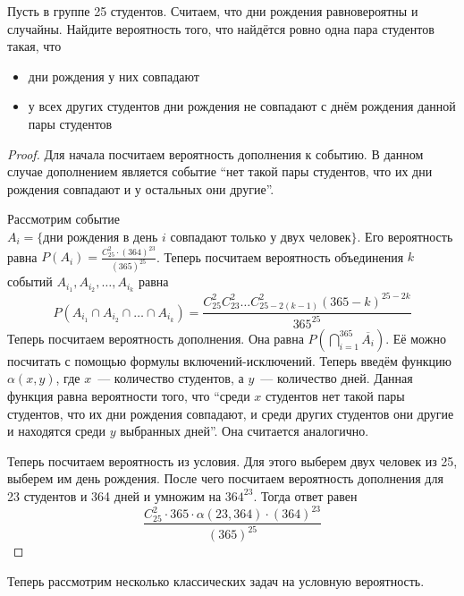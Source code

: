 \documentclass[a4paper,12pt]{article}
\begin{document}
\begin{problem}
	Пусть в группе 25 студентов. Считаем, что дни рождения равновероятны и случайны. Найдите вероятность того, что найдётся ровно одна пара студентов такая, что
	\begin{itemize}
		\item дни рождения у них совпадают
		\item у всех других студентов дни рождения не совпадают с днём рождения данной пары студентов
	\end{itemize}
\end{problem}
\begin{proof}
	Для начала посчитаем вероятность дополнения к событию. В данном случае дополнением является событие ``нет такой пары студентов, что их дни рождения совпадают и у остальных они другие''.
	
	Рассмотрим событие \(A_i = \{\text{дни рождения в день }i\text{ совпадают только у двух человек}\}\). Его вероятность равна \(P(A_{i}) = \frac{C_{25}^{2}\cdot(364)^{23}}{(365)^{25}}\). Теперь посчитаем вероятность объединения \(k\) событий \(A_{i_1}, A_{i_2}, \ldots, A_{i_k}\) равна \[P(A_{i_1} \cap A_{i_2} \cap \ldots \cap A_{i_k}) = \frac{C_{25}^{2}C_{23}^{2} \ldots C_{25 - 2(k - 1)}^{2}(365 - k)^{25 - 2k}}{365^{25}}\]
	Теперь посчитаем вероятность дополнения. Она равна \(P\left(\bigcap\limits_{i = 1}^{365} \overline{A_i}\right)\). Её можно посчитать с помощью формулы включений-исключений. Теперь введём функцию \(\alpha(x, y)\), где \(x\)~--- количество студентов, а \(y\)~--- количество дней. Данная функция равна вероятности того, что ``среди \(x\) студентов нет такой пары студентов, что их дни рождения совпадают, и среди других студентов они другие и находятся среди \(y\) выбранных дней''. Она считается аналогично.
	
	Теперь посчитаем вероятность из условия. Для этого выберем двух человек из 25, выберем им день рождения. После чего посчитаем вероятность дополнения для 23 студентов и 364 дней и умножим на \(364^{23}\). Тогда ответ равен 
	\[\frac{C_{25}^{2} \cdot 365 \cdot \alpha(23, 364) \cdot (364)^{23}}{(365)^{25}}\]
\end{proof}

Теперь рассмотрим несколько классических задач на условную вероятность.
\end{document}
